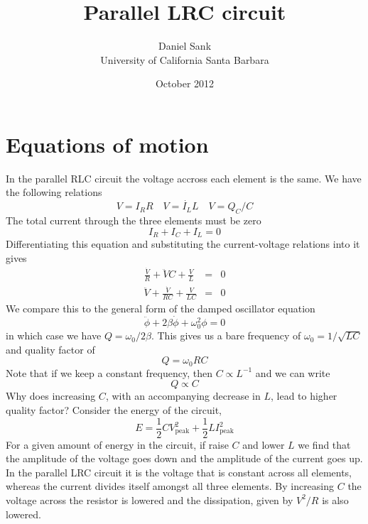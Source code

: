 \documentclass{article}
\title{Parallel LRC circuit}
\author{Daniel Sank\\\small{University of California Santa Barbara}}
\date{October 2012}
\begin{document}
\maketitle

\section{Equations of motion}

In the parallel RLC circuit the voltage accross each element is the same. We have the following relations\begin{equation}
V=I_{R}R\quad V=\dot{I_{L}}L\quad V=Q_{C}/C\end{equation}
The total current through the three elements must be zero\begin{equation}
I_{R}+I_{C}+I_{L}=0\end{equation}
Differentiating this equation and substituting the current-voltage relations into it gives\begin{eqnarray*}
\frac{\dot{V}}{R}+\ddot{V}C+\frac{V}{L} & = & 0\\
\ddot{V}+\frac{\dot{V}}{RC}+\frac{V}{LC} & = & 0\end{eqnarray*}
We compare this to the general form of the damped oscillator equation\begin{equation}
\ddot{\phi}+2\beta\dot{\phi}+\omega_{0}^{2}\phi=0\end{equation}
in which case we have $Q=\omega_{0}/2\beta$. This gives us a bare frequency of $\omega_{0}=1/\sqrt{LC}$ and quality factor of \begin{equation}
Q=\omega_{0}RC\end{equation}
Note that if we keep a constant frequency, then $C\propto L^{-1}$ and we can write \begin{equation}
Q\propto C\end{equation}
Why does increasing $C$, with an accompanying decrease in $L$, lead
to higher quality factor? Consider the energy of the circuit, \begin{equation}
E=\frac{1}{2}CV_{\textrm{peak}}^{2}+\frac{1}{2}LI_{\textrm{peak}}^{2}\end{equation}
For a given amount of energy in the circuit, if raise $C$ and lower $L$ we find that the amplitude of the voltage goes down and the amplitude of the current goes up. In the parallel LRC circuit it is the voltage that is constant across all elements, whereas the current divides itself amongst all three elements. By increasing $C$ the voltage across the resistor is lowered and the dissipation, given by $V^{2}/R$ is also lowered.
\end{document}
